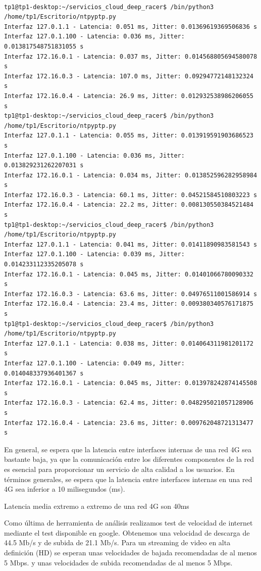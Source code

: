 \begin{lstlisting}[caption={Salida del fichero python que calcula retardos entre interfaces.}]

tp1@tp1-desktop:~/servicios_cloud_deep_racer$ /bin/python3 /home/tp1/Escritorio/ntpyptp.py
Interfaz 127.0.1.1 - Latencia: 0.051 ms, Jitter: 0.01369619369506836 s
Interfaz 127.0.1.100 - Latencia: 0.036 ms, Jitter: 0.013817548751831055 s
Interfaz 172.16.0.1 - Latencia: 0.037 ms, Jitter: 0.014568805694580078 s
Interfaz 172.16.0.3 - Latencia: 107.0 ms, Jitter: 0.09294772148132324 s
Interfaz 172.16.0.4 - Latencia: 26.9 ms, Jitter: 0.012932538986206055 s
tp1@tp1-desktop:~/servicios_cloud_deep_racer$ /bin/python3 /home/tp1/Escritorio/ntpyptp.py
Interfaz 127.0.1.1 - Latencia: 0.055 ms, Jitter: 0.013919591903686523 s
Interfaz 127.0.1.100 - Latencia: 0.036 ms, Jitter: 0.013829231262207031 s
Interfaz 172.16.0.1 - Latencia: 0.034 ms, Jitter: 0.013852596282958984 s
Interfaz 172.16.0.3 - Latencia: 60.1 ms, Jitter: 0.04521584510803223 s
Interfaz 172.16.0.4 - Latencia: 22.2 ms, Jitter: 0.008130550384521484 s
tp1@tp1-desktop:~/servicios_cloud_deep_racer$ /bin/python3 /home/tp1/Escritorio/ntpyptp.py
Interfaz 127.0.1.1 - Latencia: 0.041 ms, Jitter: 0.01411890983581543 s
Interfaz 127.0.1.100 - Latencia: 0.039 ms, Jitter: 0.014233112335205078 s
Interfaz 172.16.0.1 - Latencia: 0.045 ms, Jitter: 0.01401066780090332 s
Interfaz 172.16.0.3 - Latencia: 63.6 ms, Jitter: 0.04976511001586914 s
Interfaz 172.16.0.4 - Latencia: 23.4 ms, Jitter: 0.009380340576171875 s
tp1@tp1-desktop:~/servicios_cloud_deep_racer$ /bin/python3 /home/tp1/Escritorio/ntpyptp.py
Interfaz 127.0.1.1 - Latencia: 0.038 ms, Jitter: 0.014064311981201172 s
Interfaz 127.0.1.100 - Latencia: 0.049 ms, Jitter: 0.014048337936401367 s
Interfaz 172.16.0.1 - Latencia: 0.045 ms, Jitter: 0.013978242874145508 s
Interfaz 172.16.0.3 - Latencia: 62.4 ms, Jitter: 0.048295021057128906 s
Interfaz 172.16.0.4 - Latencia: 23.6 ms, Jitter: 0.009762048721313477 s
\end{lstlisting}

En general, se espera que la latencia entre interfaces internas de una red 4G sea bastante baja, ya que la comunicación entre los diferentes componentes de la red es esencial para proporcionar un servicio de alta calidad a los usuarios. En términos generales, se espera que la latencia entre interfaces internas en una red 4G sea inferior a 10 milisegundos (ms).

Latencia media extremo a extremo de una red 4G son 40ms


Como última de herramienta de análisis realizamos test de velocidad de internet mediante el test disponible en google.
Obtenemos una velocidad de descarga de 44.5 Mb/s y de subida de 21.1 Mb/s. Para un streaming de video en alta definición (HD) se esperan unas velocidades de bajada recomendadas de al menos 5 Mbps. y unas velocidades de subida recomendadas de al menos 5 Mbps.


